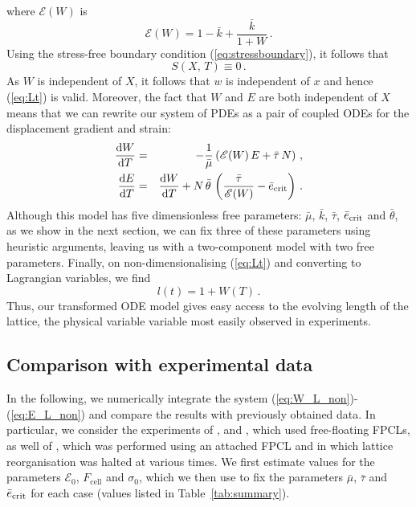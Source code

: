 where $\mathscr{E}(W)$ is
\begin{equation}
\label{eq:EW}
\mathscr{E}(W)=1-\bar{k}+\frac{\bar{k}}{1+W}\,.
\end{equation}
Using the stress-free boundary condition (\ref{eq:stressboundary}), it follows that
\[S(X,\,T)\equiv 0\,.\]
As $W$ is independent of $X$, it follows that $w$ is independent of $x$ and hence (\ref{eq:Lt}) is valid. Moreover, the fact that $W$ and $E$ are both independent of $X$ means that we can rewrite our system of PDEs as a pair of coupled ODEs for the displacement gradient and strain:
\begin{eqnarray}
\label{eq:W_L_non}
\frac{\mathrm{d}W}{\mathrm{d}T}&=& -\frac{1}{\bar{\mu}}\left(\mathscr{E}(W)\,E + \bar{\tau}\,N\right)\,,\\
\label{eq:E_L_non}
\frac{\mathrm{d}E}{\mathrm{d}T}&=& \frac{\mathrm{d}W}{\mathrm{d}T} + N\,\bar{\theta}\,\left(\frac{\bar{\tau}}{\mathscr{E}(W)}-{\bar{e}}_{\rm{crit}}\right)\,.
\end{eqnarray}
Although this model has five dimensionless free parameters:  $\bar{\mu}$, $\bar{k}$, $\bar{\tau}$, $\bar{e}_{\rm{crit}}$ and $\bar{\theta}$, as we show in the next section, we can fix three of these parameters using heuristic arguments, leaving us with a  two-component model with two free parameters. Finally, on non-dimensionalising (\ref{eq:Lt}) and converting to Lagrangian variables, we find
\begin{equation}
l(t)=1+W(T)\,.
\label{eq:lW}
\end{equation}
Thus, our transformed ODE model gives easy access to the evolving length of the lattice, the physical variable variable most easily observed in experiments.

\subsection{Comparison with experimental data}
\label{SS:numerics}

In the following, we numerically integrate the system (\ref{eq:W_L_non})-(\ref{eq:E_L_non}) and compare the results with previously obtained data. In particular, we consider the experiments of \citet{Bell1979}, \citet{Talas1997} and \citet{Feng2003}, which used free-floating FPCLs, as well of \citet{Guidry1985}, which was performed using an attached FPCL and in which lattice reorganisation was halted at various times. We first estimate values for the parameters $\mathcal{E}_{0}$, $F_\text{cell}$ and $\sigma_0$, which we then use to fix the parameters $\bar{\mu}$, $\bar{\tau}$ and $\bar{e}_{\rm crit}$ for each case (values listed in Table~\ref{tab:summary}).

